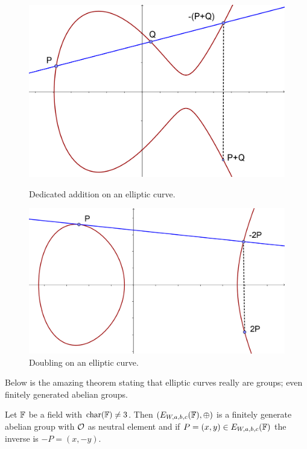 \begin{figure}[htp]
\begin{minipage}[b]{0.5\linewidth}
\centering
\includegraphics[scale=1]{addition_elliptic_curve.png}
\caption{Dedicated addition on an elliptic curve.}
\label{fig:dedicatedAddition}
\end{minipage}
\hspace{0.5cm}
\begin{minipage}[b]{0.5\linewidth}
\centering
\includegraphics[scale=1.3]{doubling_elliptic_curve.png}
\caption{Doubling on an elliptic curve.\newline}
\label{fig:doubling}
\end{minipage}
\end{figure}
Below is the amazing theorem stating that elliptic curves really are groups; even finitely generated abelian groups. 
\begin{thm}\label{thm:ellipticGroupComposition}
Let $\mathbb{F}$ be a field with $\text{char}(\mathbb{F})\neq 3$. Then $(E_{W,a,b,c}(\mathbb{F}),\oplus)$ is a finitely generate abelian group with $\mathcal{O}$ as neutral element and if $P=(x,y)\in E_{W,a,b,c}(\mathbb{F})$ the inverse is $-P=(x,-y)$.
\end{thm}
